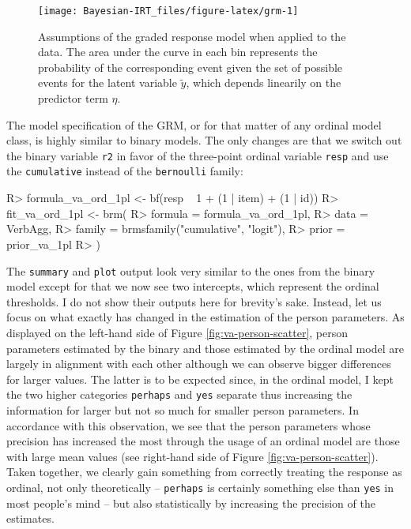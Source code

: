 \documentclass[jss]{jss}
\begin{document}
\begin{CodeChunk}
\begin{figure}

{\centering \texttt{[image: Bayesian-IRT\_files/figure-latex/grm-1]} 

}

\caption{Assumptions of the graded response model when applied to the  data. The area under the curve in each bin represents the probability of the corresponding event given the set of possible events for the latent variable $\tilde{y}$, which depends linearily on the predictor term $\eta$.}\label{fig:grm}
\end{figure}
\end{CodeChunk}

The model specification of the GRM, or for that matter of any ordinal
model class, is highly similar to binary models. The only changes are
that we switch out the binary variable \texttt{r2} in favor of the
three-point ordinal variable \texttt{resp} and use the
\texttt{cumulative} instead of the \texttt{bernoulli} family:

\begin{CodeChunk}

\begin{CodeInput}
R> formula_va_ord_1pl <- bf(resp ~ 1 + (1 | item) + (1 | id))
R> fit_va_ord_1pl <- brm(
R>   formula = formula_va_ord_1pl,
R>   data = VerbAgg,
R>   family = brmsfamily("cumulative", "logit"),
R>   prior = prior_va_1pl
R> )
\end{CodeInput}
\end{CodeChunk}

The \texttt{summary} and \texttt{plot} output look very similar to the
ones from the binary model except for that we now see two intercepts,
which represent the ordinal thresholds. I do not show their outputs here
for brevity's sake. Instead, let us focus on what exactly has changed in
the estimation of the person parameters. As displayed on the left-hand
side of Figure \ref{fig:va-person-scatter}, person parameters estimated
by the binary and those estimated by the ordinal model are largely in
alignment with each other although we can observe bigger differences for
larger values. The latter is to be expected since, in the ordinal model,
I kept the two higher categories \texttt{perhaps} and \texttt{yes}
separate thus increasing the information for larger but not so much for
smaller person parameters. In accordance with this observation, we see
that the person parameters whose precision has increased the most
through the usage of an ordinal model are those with large mean values
(see right-hand side of Figure \ref{fig:va-person-scatter}). Taken
together, we clearly gain something from correctly treating the response
as ordinal, not only theoretically -- \texttt{perhaps} is certainly
something else than \texttt{yes} in most people's mind -- but also
statistically by increasing the precision of the estimates.
\end{document}
